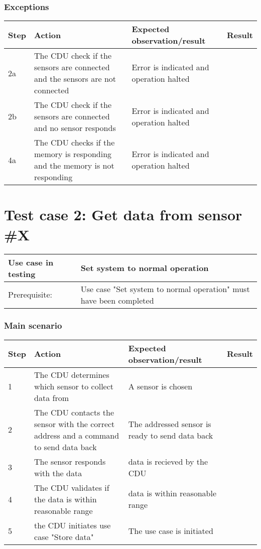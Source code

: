 \subsubsection{Exceptions}
\begin{table}[H]
    \begin{tabular}{|l|p{7cm}|p{5cm}|l|}
    \hline
    Step & Action & Expected observation/result & Result \\ \hline
    2a & The CDU check if the sensors are connected and the sensors are not connected & Error is indicated and operation halted & ~ \\ \hline
    2b & The CDU check if the sensors are connected and no sensor responds & Error is indicated and operation halted & ~ \\ \hline
    4a & The CDU checks if the memory is responding and the memory is not responding & Error is indicated and operation halted & ~ \\ \hline
    \end{tabular}
\end{table}

\section{Test case 2: Get data from sensor \#X}
\begin{table}[H]
    \begin{tabular}{|l|p{7cm}|}
    \hline
    Use case in testing & Set system to normal operation \\ \hline
    Prerequisite: & Use case "Set system to normal operation" must have been completed \\ \hline
    \end{tabular}
\end{table}

\subsubsection{Main scenario}
\begin{table}[H]
    \begin{tabular}{|l|p{7cm}|p{5cm}|l|}
    \hline
    Step & Action & Expected observation/result & Result \\ \hline
    1 & The CDU determines which sensor to collect data from & A sensor is chosen & ~ \\ \hline
    2 & The CDU contacts the sensor with the correct address and a command to send data back & The addressed sensor is ready to send data back & ~ \\ \hline
    3 & The sensor responds with the data & data is recieved by the CDU & ~ \\ \hline
    4 & The CDU validates if the data is within reasonable range & data is within reasonable range & ~ \\ \hline
    5 & the CDU initiates use case "Store data" & The use case is initiated & ~ \\ \hline
    \end{tabular}
\end{table}

